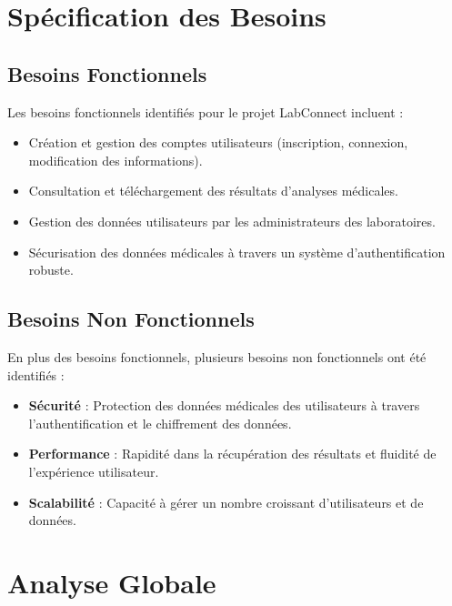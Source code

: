 \documentclass[12pt,a4paper]{report}
\begin{document}
\section{Spécification des Besoins}

\subsection{Besoins Fonctionnels}
Les besoins fonctionnels identifiés pour le projet LabConnect incluent :

\begin{itemize}
    \item Création et gestion des comptes utilisateurs (inscription, connexion, modification des informations).
    \item Consultation et téléchargement des résultats d'analyses médicales.
    \item Gestion des données utilisateurs par les administrateurs des laboratoires.
    \item Sécurisation des données médicales à travers un système d'authentification robuste.
\end{itemize}

\subsection{Besoins Non Fonctionnels}
En plus des besoins fonctionnels, plusieurs besoins non fonctionnels ont été identifiés :

\begin{itemize}
    \item \textbf{Sécurité} : Protection des données médicales des utilisateurs à travers l'authentification et le chiffrement des données.
    \item \textbf{Performance} : Rapidité dans la récupération des résultats et fluidité de l'expérience utilisateur.
    \item \textbf{Scalabilité} : Capacité à gérer un nombre croissant d'utilisateurs et de données.
\end{itemize}

\section{Analyse Globale}
\end{document}
